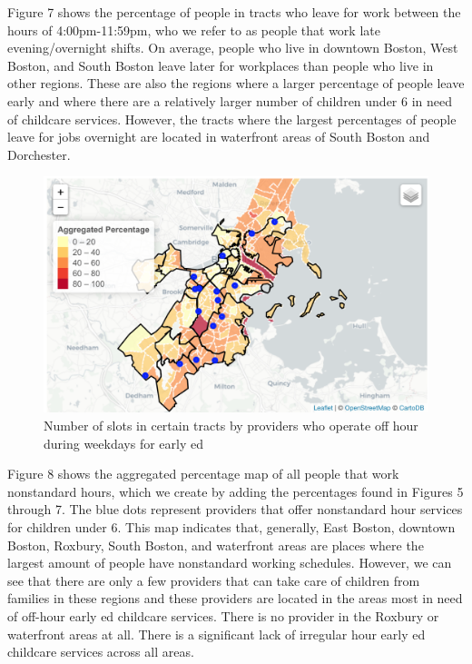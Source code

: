 \documentclass[10pt,letterpaper]{article}
\begin{document}
Figure 7 shows the percentage of people in tracts who leave for work
between the hours of 4:00pm-11:59pm, who we refer to as people that work
late evening/overnight shifts. On average, people who live in downtown
Boston, West Boston, and South Boston leave later for workplaces than
people who live in other regions. These are also the regions where a
larger percentage of people leave early and where there are a relatively
larger number of children under 6 in need of childcare services.
However, the tracts where the largest percentages of people leave for
jobs overnight are located in waterfront areas of South Boston and
Dorchester.

\begin{figure}

{\centering \includegraphics[width=0.8\linewidth]{aggregatehourdemand} 

}

\caption{Number of slots in certain tracts by providers who operate off hour during weekdays for early ed}\label{fig:unnamed-chunk-14}
\end{figure}

Figure 8 shows the aggregated percentage map of all people that work
nonstandard hours, which we create by adding the percentages found in
Figures 5 through 7. The blue dots represent providers that offer
nonstandard hour services for children under 6. This map indicates that,
generally, East Boston, downtown Boston, Roxbury, South Boston, and
waterfront areas are places where the largest amount of people have
nonstandard working schedules. However, we can see that there are only a
few providers that can take care of children from families in these
regions and these providers are located in the areas most in need of
off-hour early ed childcare services. There is no provider in the
Roxbury or waterfront areas at all. There is a significant lack of
irregular hour early ed childcare services across all areas.
\end{document}
